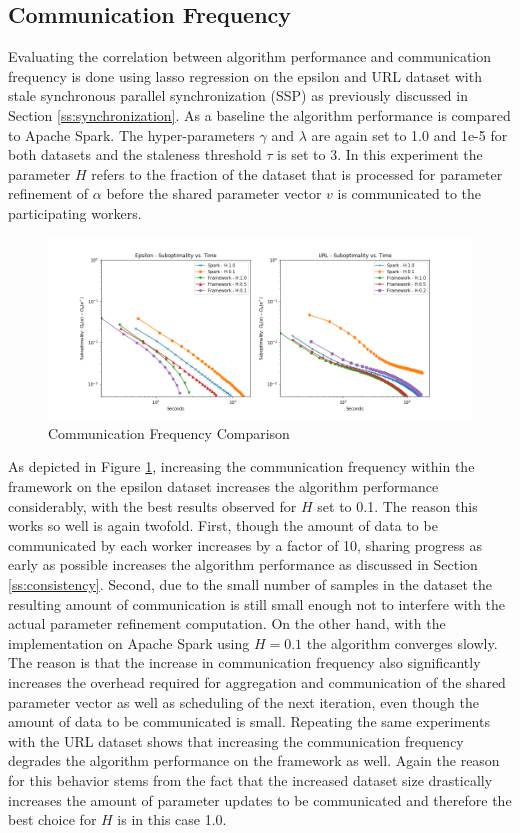 \subsection{Communication Frequency}
Evaluating the correlation between algorithm performance and communication frequency is done using lasso regression on the epsilon and URL dataset with stale synchronous parallel synchronization (SSP) as previously discussed in Section \ref{ss:synchronization}.
As a baseline the algorithm performance is compared to Apache Spark.
The hyper-parameters $\gamma$ and $\lambda$ are again set to 1.0 and 1e-5 for both datasets and the staleness threshold $\tau$ is set to 3.
In this experiment the parameter $H$ refers to the fraction of the dataset that is processed for parameter refinement of $\alpha$ before the shared parameter vector $v$ is communicated to the participating workers.
\begin{figure}[ht]
\centering
\includegraphics[width=1.0\textwidth]{img/comm_freq_cmp.png}
\caption{Communication Frequency Comparison}
\label{fig:comm_freq_cmp}
\end{figure}
As depicted in Figure \ref{fig:comm_freq_cmp}, increasing the communication frequency within the framework on the epsilon dataset increases the algorithm performance considerably, with the best results observed for $H$ set to 0.1.
The reason this works so well is again twofold.
First, though the amount of data to be communicated by each worker increases by a factor of 10, sharing progress as early as possible increases the algorithm performance as discussed in Section \ref{ss:consistency}.
Second, due to the small number of samples in the dataset the resulting amount of communication is still small enough not to interfere with the actual parameter refinement computation.
On the other hand, with the implementation on Apache Spark using $H=0.1$ the algorithm converges slowly.
The reason is that the increase in communication frequency also significantly increases the overhead required for aggregation and communication of the shared parameter vector as well as scheduling of the next iteration, even though the amount of data to be communicated is small.
Repeating the same experiments with the URL dataset shows that increasing the communication frequency degrades the algorithm performance on the framework as well.
Again the reason for this behavior stems from the fact that the increased dataset size drastically increases the amount of parameter updates to be communicated and therefore the best choice for $H$ is in this case 1.0.

